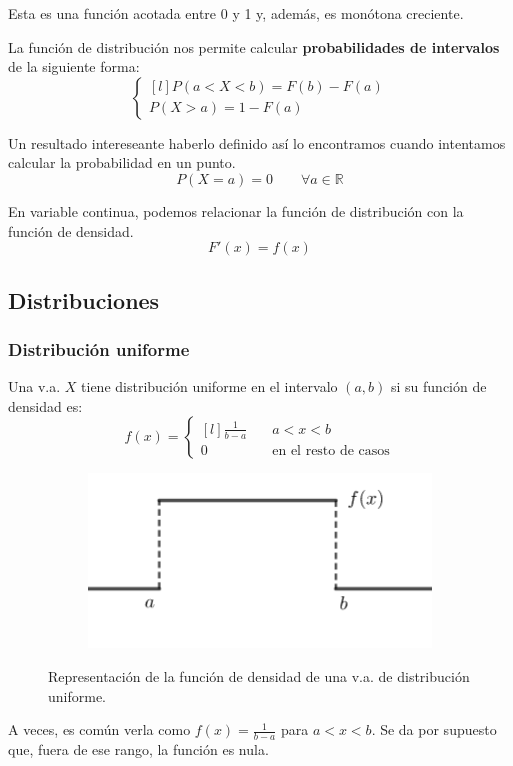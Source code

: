 \documentclass[a4paper]{book}
\begin{document}
Esta es una función acotada entre 0 y 1 y, además, es monótona creciente.

La función de distribución nos permite calcular \textbf{probabilidades de intervalos} de la siguiente forma: \[\left\{ \begin{matrix*}[l]
		P(a<X<b) = F(b) - F(a)\\[5pt]
		P(X>a) = 1 - F(a) \end{matrix*}\right.\]

Un resultado intereseante haberlo definido así lo encontramos cuando intentamos calcular la probabilidad en un punto. \[P(X=a) = 0 \qquad \forall a \in \mathbb{R}\]

\begin{nota}
	En variable continua, podemos relacionar la función de distribución con la función de densidad.
	\[F'(x) = f(x)\]
\end{nota}


\subsection{Distribuciones}
\subsubsection{Distribución uniforme}
Una v.a. $X$ tiene distribución uniforme en el intervalo $(a,b)$ si su función de densidad es: \[f(x) = \left\{ \begin{matrix*}[l]
		\displaystyle{\frac{1}{b-a}} & \quad a<x<b\\[15pt]
		0 & \quad \text{en el resto de casos}
	\end{matrix*}\right.\]

\begin{figure}[h!]
	\begin{subfigure}[b]{\linewidth}
		\centering
		\includegraphics[width=0.4\linewidth]{./Imágenes/aaa.png}
	\end{subfigure}
	\caption{Representación de la función de densidad de una v.a. de distribución uniforme.}
\end{figure}

A veces, es común verla como $f(x) = \frac{1}{b-a}$ para $a<x<b$. Se da por supuesto que, fuera de ese rango, la función es nula.
\end{document}
